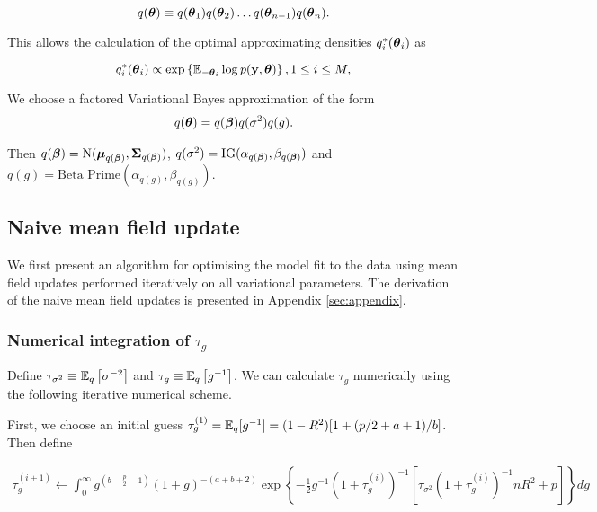 \documentclass{amsart}[12pt]
\begin{document}
\begin{equation*}
	q({\boldsymbol \theta}) \equiv q({\boldsymbol \theta}_1) q({\boldsymbol \theta}_2) \ldots q({\boldsymbol \theta}_{n-1}) q({\boldsymbol \theta}_n).
\end{equation*}

This allows the calculation of the optimal approximating densities $q_i^*({\boldsymbol \theta}_i)$ as

\begin{equation*}
	q_i^*({\boldsymbol \theta}_i) \propto \exp \left \{ \mathbb{E}_{-{\boldsymbol \theta}_i} \log p({\bf y}, {\boldsymbol \theta}) \right \}, 1 \leq i \leq M,
\end{equation*}

We choose a factored Variational Bayes approximation of the form
\begin{align*}
	q({\boldsymbol \theta}) = q({\boldsymbol \beta}) q(\sigma^2) q(g). 
\end{align*}

Then $q({\boldsymbol \beta}) = \text{N}({\boldsymbol \mu}_{q({\boldsymbol \beta})}, {\boldsymbol \Sigma}_{q({\boldsymbol \beta})})$, $q(\sigma^2) = \text{IG}(\alpha_{q({\boldsymbol \beta})}, \beta_{q({\boldsymbol \beta})})$ and $q(g) = \text{Beta Prime}(\alpha_{q(g)}, \beta_{q(g)})$.

\subsection{Naive mean field update}
\label{sec:naive_mean_field_updates}

We first present an algorithm for optimising the model fit to the data using mean field updates performed
iteratively on all variational parameters. The derivation of the naive mean field updates is presented in
Appendix \ref{sec:appendix}.

\subsubsection{Numerical integration of $\tau_g$}
\label{sec:num_int}

Define $\tau_{\sigma^2} \equiv \mathbb{E}_q \left[ \sigma^{-2} \right]$ and $\tau_g \equiv \mathbb{E}_q \left[ g^{-1}
\right]$. We can calculate $\tau_g$ numerically using the following iterative numerical scheme.

First, we choose an initial guess $\tau_g^{(1)} = \mathbb{E}_q [g^{-1}] = (1 - R^2) [1 + (p / 2 + a + 1)/b]$. Then
define

\begin{align*}
	\tau_g^{(i+1)} \leftarrow \int_0^\infty g^{\left(b - \frac{p}{2} - 1\right)}                                   
	(1 + g)^{- (a + b + 2)}                                                                                        
	\exp \left \{- \frac{1}{2} g^{-1}  (1 + \tau_g^{(i)})^{-1} [\tau_{\sigma^2} (1 + \tau_g^{(i)})^{-1} n R^2 + p] 
	\right \} dg                                                                                                   
\end{align*}
\end{document}

